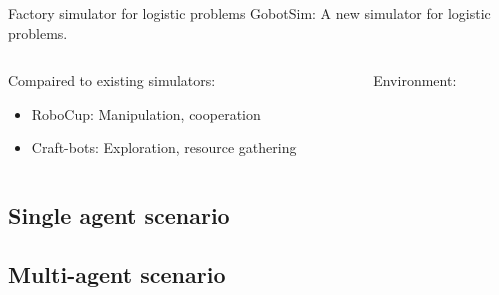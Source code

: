 \begin{frame}{Factory simulator for logistic problems}
    GobotSim: A new simulator for logistic problems.
    \begin{columns}
        \begin{column}{0.5\textwidth}
            Compaired to existing simulators:
            \begin{itemize}
                \item RoboCup: Manipulation, cooperation
                \item Craft-bots: Exploration, resource gathering
            \end{itemize}
        \end{column}
        \begin{column}{0.5\textwidth}
            Environment: 
        \end{column}
    \end{columns}
\end{frame}

\subsection{Single agent scenario}



\subsection{Multi-agent scenario}



